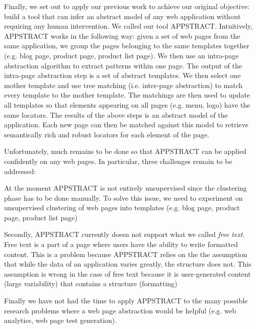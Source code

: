 Finally, we set out to apply our previous work to achieve our original objective: build a tool that can infer an abstract model of any web application without requiring any human intervention.
We called our tool APPSTRACT.
Intuitively, APPSTRACT works in the following way: given a set of web pages from the same application, we group the pages belonging to the same templates together (e.g. blog page, product page, product list page). We then use an intra-page abstraction algorithm to extract patterns within one page.
The output of the intra-page abstraction step is a set of abstract templates.
We then select one mother template and use tree matching (i.e. inter-page abstraction) to match every template to the mother template.
The matchings are then used to update all templates so that elements appearing on all pages (e.g. menu, logo) have the same locators.
The results of the above steps is an abstract model of the application.
Each new page can then be matched against this model to retrieve semantically rich and robust locators for each element of the page.


Unfortunately, much remains to be done so that APPSTRACT can be applied confidently on any web pages.
In particular, three challenges remain to be addressed:

At the moment APPSTRACT is not entirely unsupervised since the clustering phase has to be done manually.
To solve this issue, we need to experiment on unsupervised clustering of web pages into templates
(e.g. blog page, product page, product list page)

Secondly, APPSTRACT currently doesn not support what we called \textit{free text}.
Free text is a part of a page where users have the ability to write formatted content.
This is a problem because APPSTRACT relies on the the assumption that while the data of an application varies greatly, the structure does not. This assumption is wrong in the case of free text because it is user-generated content (large variability) that contains a structure (formatting)

Finally we have not had the time to apply APPSTRACT to the many possible research problems where a web page abstraction would be helpful (e.g. web analytics, web page test generation).















